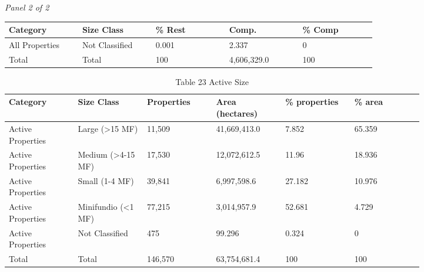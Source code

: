 \documentclass[12pt]{article}
\begin{document}
\begin{landscape}
\begin{table}[H]
\vspace{0.6em}

\textit{Panel 2 of 2}\\[2pt]
{\fontsize{12}{14}\selectfont
\setlength{\tabcolsep}{3pt}
\renewcommand{\arraystretch}{1.08}
\begin{tabular}{p{0.164\linewidth}p{0.164\linewidth}p{0.164\linewidth}p{0.164\linewidth}p{0.164\linewidth}}
\toprule
Category & Size Class & \% Rest & Comp. & \% Comp \\
\midrule
All Properties & Not Classified & 0.001 & 2.337 & 0 \\
Total & Total & 100 & 4,606,329.0 & 100 \\
\bottomrule
\end{tabular}
}
\end{table}
\end{landscape}

\begin{table}[H]
\centering
\caption{Table 23 Active Size}
{\fontsize{12}{14}\selectfont
\setlength{\tabcolsep}{3pt}
\renewcommand{\arraystretch}{1.08}
\begin{tabular}{p{0.137\linewidth}p{0.137\linewidth}p{0.137\linewidth}p{0.137\linewidth}p{0.137\linewidth}p{0.137\linewidth}}
\toprule
Category & Size Class & Properties & Area (hectares) & \% properties & \% area \\
\midrule
Active Properties & Large (>15 MF) & 11,509 & 41,669,413.0 & 7.852 & 65.359 \\
Active Properties & Medium (>4-15 MF) & 17,530 & 12,072,612.5 & 11.96 & 18.936 \\
Active Properties & Small (1-4 MF) & 39,841 & 6,997,598.6 & 27.182 & 10.976 \\
Active Properties & Minifundio (<1 MF) & 77,215 & 3,014,957.9 & 52.681 & 4.729 \\
Active Properties & Not Classified & 475 & 99.296 & 0.324 & 0 \\
Total & Total & 146,570 & 63,754,681.4 & 100 & 100 \\
\bottomrule
\end{tabular}
}
\end{table}
\end{document}

